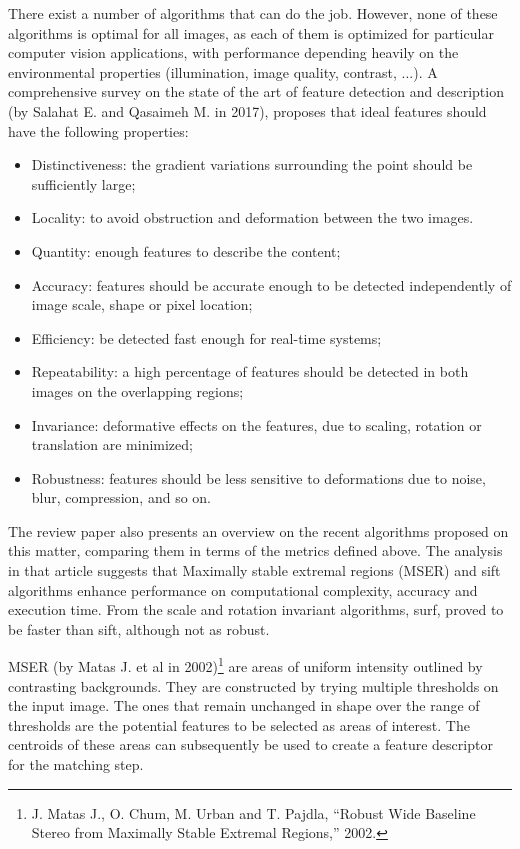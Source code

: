 There exist a number of algorithms that can do the job. However, none of these algorithms is optimal for all images, as each of them is optimized for particular computer vision applications, with performance depending heavily on the environmental properties (illumination, image quality, contrast, ...). A comprehensive survey on the state of the art of feature detection and description  \cite{featsift} (by Salahat E. and Qasaimeh M. in 2017), proposes that ideal features should have the following properties:
\begin{itemize}
	\item Distinctiveness: the gradient variations surrounding the point should be sufficiently large;
	\item Locality: to avoid obstruction and deformation between the two images.
	\item Quantity: enough features to describe the content;
	\item Accuracy: features should be accurate enough to be detected independently of image scale, shape or pixel location;
	\item Efficiency: be detected fast enough for real-time systems;
	\item Repeatability: a high percentage of features should be detected in both images on the overlapping regions;
	\item Invariance: deformative effects on the features, due to scaling, rotation or translation are minimized;
	\item Robustness: features should be less sensitive to deformations due to noise, blur, compression, and so on.
\end{itemize} 
The review paper also presents an overview on the recent algorithms proposed on this matter, comparing them in terms of the metrics defined above. The analysis in that article suggests that Maximally stable extremal regions (MSER) and \acrfull{sift} algorithms enhance performance on computational complexity, accuracy and execution time. From the scale and rotation invariant algorithms, \acrfull{surf}, proved to be faster than \acrshort{sift}, although not as robust.

MSER (by Matas J. et al in 2002)\footnote{J. Matas J., O. Chum, M. Urban and T. Pajdla, “Robust Wide Baseline Stereo from Maximally Stable Extremal Regions,” 2002.} are areas of uniform intensity outlined by contrasting backgrounds. They are constructed by trying multiple thresholds on the input image. The ones that remain unchanged in shape over the range of thresholds are the potential features to be selected as areas of interest. The centroids of these areas can subsequently be used to create a feature descriptor for the matching step.

